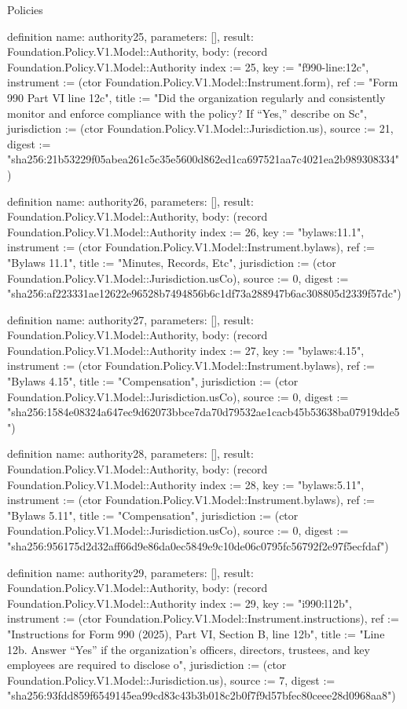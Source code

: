 \begin{lexlean}{Policies}
\begin{semanticmodule}
definition{
  name: authority25,
  parameters: [],
  result: Foundation.Policy.V1.Model::Authority,
  body: (record Foundation.Policy.V1.Model::Authority {index := 25, key := "f990-line:12c", instrument := (ctor Foundation.Policy.V1.Model::Instrument.form), ref := "Form 990 Part VI line 12c", title := "Did the organization regularly and consistently monitor and enforce compliance with the policy? If “Yes,” describe on Sc", jurisdiction := (ctor Foundation.Policy.V1.Model::Jurisdiction.us), source := 21, digest := "sha256:21b53229f05abea261c5c35e5600d862ed1ca697521aa7c4021ea2b989308334"})
}

definition{
  name: authority26,
  parameters: [],
  result: Foundation.Policy.V1.Model::Authority,
  body: (record Foundation.Policy.V1.Model::Authority {index := 26, key := "bylaws:11.1", instrument := (ctor Foundation.Policy.V1.Model::Instrument.bylaws), ref := "Bylaws 11.1", title := "Minutes, Records, Etc", jurisdiction := (ctor Foundation.Policy.V1.Model::Jurisdiction.usCo), source := 0, digest := "sha256:af223331ae12622e96528b7494856b6c1df73a288947b6ac308805d2339f57dc"})
}

definition{
  name: authority27,
  parameters: [],
  result: Foundation.Policy.V1.Model::Authority,
  body: (record Foundation.Policy.V1.Model::Authority {index := 27, key := "bylaws:4.15", instrument := (ctor Foundation.Policy.V1.Model::Instrument.bylaws), ref := "Bylaws 4.15", title := "Compensation", jurisdiction := (ctor Foundation.Policy.V1.Model::Jurisdiction.usCo), source := 0, digest := "sha256:1584e08324a647ec9d62073bbce7da70d79532ae1cacb45b53638ba07919dde5"})
}

definition{
  name: authority28,
  parameters: [],
  result: Foundation.Policy.V1.Model::Authority,
  body: (record Foundation.Policy.V1.Model::Authority {index := 28, key := "bylaws:5.11", instrument := (ctor Foundation.Policy.V1.Model::Instrument.bylaws), ref := "Bylaws 5.11", title := "Compensation", jurisdiction := (ctor Foundation.Policy.V1.Model::Jurisdiction.usCo), source := 0, digest := "sha256:956175d2d32aff66d9e86da0ec5849e9c10de06c0795fc56792f2e97f5ecfdaf"})
}

definition{
  name: authority29,
  parameters: [],
  result: Foundation.Policy.V1.Model::Authority,
  body: (record Foundation.Policy.V1.Model::Authority {index := 29, key := "i990:l12b", instrument := (ctor Foundation.Policy.V1.Model::Instrument.instructions), ref := "Instructions for Form 990 (2025), Part VI, Section B, line 12b", title := "Line 12b. Answer “Yes” if the organization’s officers, directors, trustees, and key employees are required to disclose o", jurisdiction := (ctor Foundation.Policy.V1.Model::Jurisdiction.us), source := 7, digest := "sha256:93fdd859f6549145ea99cd83c43b3b018c2b0f7f9d57bfec80ceee28d0968aa8"})
}


\end{semanticmodule}
\end{lexlean}
